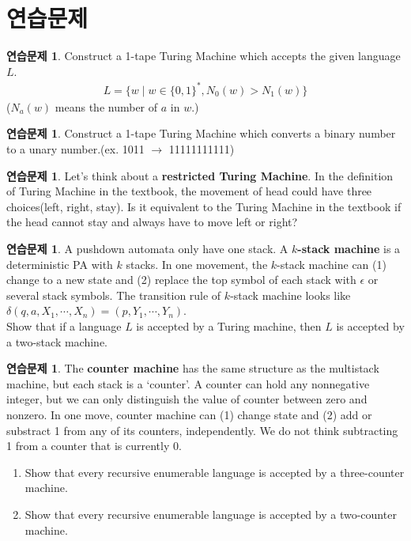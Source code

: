 \documentclass[b5paper, 10pt]{book}
\theoremstyle{definition}
\newtheorem{ec}[defn]{연습문제}
\begin{document}
\section{연습문제}
\begin{ec}
    Construct a 1-tape Turing Machine which accepts the given language $L$.
    \begin{align*}
        L = \{w \;\vert\; w \in \{0,1\}^*, N_0(w) > N_1(w) \}
    \end{align*}
    ($N_a(w)$ means the number of $a$ in $w$.)
\end{ec}
\begin{ec}
    Construct a 1-tape Turing Machine which converts a binary number to 
    a unary number.(ex. 1011 $\rightarrow$ 11111111111)
\end{ec}
\begin{ec}
    Let's think about a \textbf{restricted Turing Machine}. 
    In the definition of Turing Machine in the textbook, 
    the movement of head could have three choices(left, right, stay). 
    Is it equivalent to the Turing Machine in the textbook if the head 
    cannot stay and always have to move left or right?
\end{ec}
\begin{ec}
    A pushdown automata only have one stack. A \textbf{$k$-stack machine} is 
    a deterministic PA with $k$ stacks. In one movement, the $k$-stack machine 
    can (1) change to a new state and (2) replace the top symbol of each stack
     with $\epsilon$ or several stack symbols. The transition rule of $k$-stack
      machine looks like $\delta(q, a, X_1, \cdots, X_n) = (p, Y_1, \cdots, Y_n)$.
    \\
    Show that if a language $L$ is accepted by a Turing machine, then $L$ is
     accepted by a two-stack machine.
\end{ec}
\begin{ec}
    The \textbf{counter machine} has the same structure as the multistack machine, 
    but each stack is a `counter'. A counter can hold any nonnegative integer, but 
    we can only distinguish the value of counter between zero and nonzero. In one
     move, counter machine can (1) change state and (2) add or substract 1 from any
      of its counters, independently. We do not think subtracting 1 from a counter 
      that is currently 0. 
      \begin{enumerate}
        \item Show that every recursive enumerable language is accepted by 
        a three-counter machine.
        \item Show that every recursive enumerable language is accepted by 
        a two-counter machine.
      \end{enumerate}
\end{ec}
\end{document}

